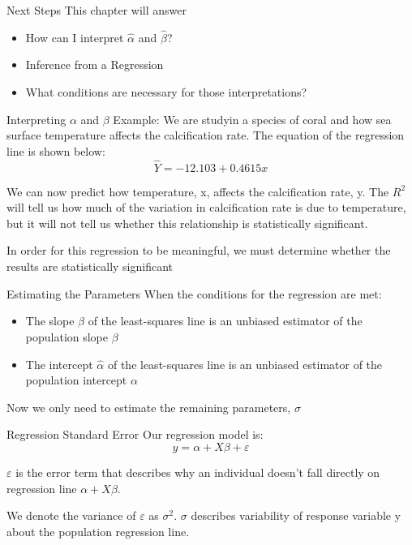 \documentclass{beamer}
\begin{document}
\begin{frame}{Next Steps}
	This chapter will answer

	\begin{itemize}
		\item How can I interpret $\hat{\alpha}$ and $\hat{\beta}$?
		\item Inference from a Regression
		\item What conditions are necessary for those interpretations?
	\end{itemize}

\end{frame}

\begin{frame}{Interpreting $\alpha$ and $\beta$}
	Example: We are studyin a species of coral and how sea surface temperature affects the calcification rate. The equation of the regression line is shown below: \[ 
		\hat{Y}=-12.103+0.4615x 
	\]

	We can now predict how temperature, x, affects the calcification rate, y. The $R^2$ will tell us how much of the variation in calcification rate is due to temperature, but it will not tell us whether this relationship is statistically significant. 
	
	In order for this regression to be meaningful, we must determine whether the results are \alert{statistically significant}
\end{frame}


\begin{frame}{Estimating the Parameters}
	When the conditions for the regression are met:
	
	\begin{itemize}
		\item The slope $\hat{\beta}$ of the least-squares line is an unbiased estimator of the population slope $\beta$
		      
		\item The intercept $\hat{\alpha}$ of the least-squares line is an unbiased estimator of the population intercept $\alpha$
	\end{itemize}
	
	Now we only need to estimate the remaining parameters, $\sigma$
\end{frame}

\begin{frame}{Regression Standard Error}
	Our regression model is: \[ 
		y = \alpha + X \beta + \varepsilon	
	\]
	
	$\varepsilon$ is the error term that describes why an individual doesn't fall directly on regression line $\alpha + X \beta$.

	We denote the variance of $\varepsilon$ as $\sigma^2$. $\sigma$ describes variability of response variable y about the population regression line. 
\end{frame}
\end{document}
